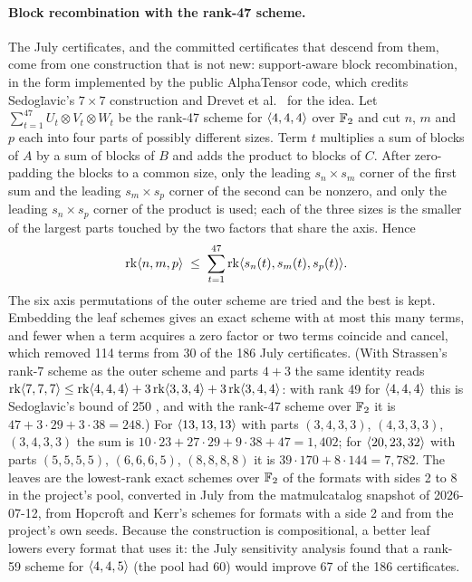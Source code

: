\paragraph{Block recombination with the rank-47 scheme.}
The July certificates, and the committed certificates that descend from them, come from one construction that is not new: support-aware block recombination, in the form implemented by the public AlphaTensor code, which credits Sedoglavic's $7\times7$ construction \cite{sedoglavic2017seven} and Drevet et al.\ \cite{drevet2011optimization} for the idea.
Let $\sum_{t=1}^{47}U_t\otimes V_t\otimes W_t$ be the rank-47 scheme for $\langle 4,4,4\rangle$ over ${\mathbb{F}_2}$ and cut $n$, $m$ and $p$ each into four parts of possibly different sizes. Term $t$ multiplies a sum of blocks of $A$ by a sum of blocks of $B$ and adds the product to blocks of $C$.
After zero-padding the blocks to a common size, only the leading $s_n\times s_m$ corner of the first sum and the leading $s_m\times s_p$ corner of the second can be nonzero, and only the leading $s_n\times s_p$ corner of the product is used; each of the three sizes is the smaller of the largest parts touched by the two factors that share the axis. Hence
\[
  \operatorname{rk}\langle n,m,p\rangle\;\le\;\sum_{t=1}^{47}\operatorname{rk}\langle s_n(t),s_m(t),s_p(t)\rangle.
\]
The six axis permutations of the outer scheme are tried and the best is kept. Embedding the leaf schemes gives an exact scheme with at most this many terms, and fewer when a term acquires a zero factor or two terms coincide and cancel, which removed 114 terms from 30 of the 186 July certificates.
(With Strassen's rank-7 scheme as the outer scheme and parts $4+3$ the same identity reads $\operatorname{rk}\langle 7,7,7\rangle\le\operatorname{rk}\langle 4,4,4\rangle+3\operatorname{rk}\langle 3,3,4\rangle+3\operatorname{rk}\langle 3,4,4\rangle$: with rank 49 for $\langle 4,4,4\rangle$ this is Sedoglavic's bound of 250 \cite{sedoglavic2017seven}, and with the rank-47 scheme over ${\mathbb{F}_2}$ it is $47+3\cdot29+3\cdot38=248$.)
For $\langle 13,13,13\rangle$ with parts $(3,4,3,3)$, $(4,3,3,3)$, $(3,4,3,3)$ the sum is $10\cdot23+27\cdot29+9\cdot38+47=1{,}402$; for $\langle 20,23,32\rangle$ with parts $(5,5,5,5)$, $(6,6,6,5)$, $(8,8,8,8)$ it is $39\cdot170+8\cdot144=7{,}782$.
The leaves are the lowest-rank exact schemes over ${\mathbb{F}_2}$ of the formats with sides 2 to 8 in the project's pool, converted in July from the matmulcatalog snapshot of 2026-07-12, from Hopcroft and Kerr's schemes for formats with a side 2 \cite{hopcroft1971minimizing} and from the project's own seeds.
Because the construction is compositional, a better leaf lowers every format that uses it: the July sensitivity analysis found that a rank-59 scheme for $\langle 4,4,5\rangle$ (the pool had 60) would improve 67 of the 186 certificates.

